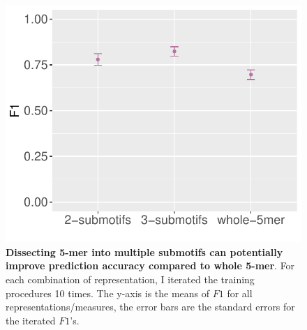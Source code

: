 \begin{figure}[h!]
    \centering
    \includegraphics[scale=1]{graphics/f1_sce_submotif.pdf}
    \caption{\textbf{Dissecting 5-mer into multiple submotifs can potentially improve prediction accuracy compared to whole 5-mer}. For each combination of representation, I iterated the training procedures 10 times. The y-axis is the means of $F1$ for all representations/measures, the error bars are the standard errors for the iterated $F1$'s.}
    \label{fig:f1_sce_submotif}
\end{figure}
